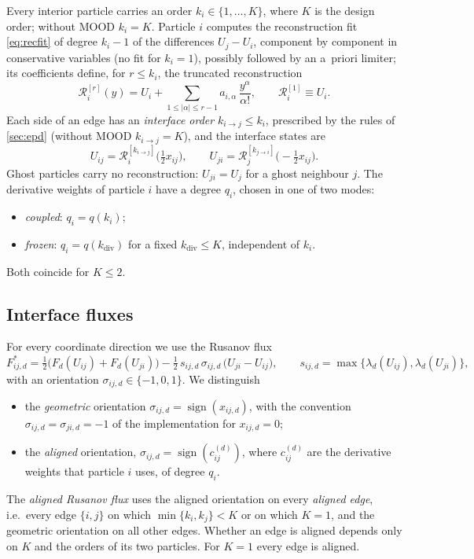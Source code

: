 \documentclass[11pt,a4paper]{article}
\theoremstyle{plain}
\theoremstyle{definition}
\theoremstyle{remark}
\numberwithin{equation}{section}
\newcommand{\Fs}{F^{*}}
\newcommand{\sgn}{\operatorname{sign}}
\newcommand{\ord}[2]{k_{#1\to #2}}
\newcommand{\qdiv}{q}
\begin{document}
Every interior particle carries an order $k_i\in\{1,\dots,K\}$, where $K$ is the design order; without MOOD $k_i=K$. Particle $i$ computes the reconstruction fit \eqref{eq:recfit} of degree $k_i-1$ of the differences $U_j-U_i$, component by component in conservative variables (no fit for $k_i=1$), possibly followed by an a~priori limiter; its coefficients define, for $r\le k_i$, the truncated reconstruction
\begin{equation}
\mathcal{R}^{[r]}_i(y) = U_i + \sum_{1\le|\alpha|\le r-1} a_{i,\alpha}\,\frac{y^\alpha}{\alpha!},\qquad \mathcal{R}^{[1]}_i\equiv U_i .
\end{equation}
Each side of an edge has an \emph{interface order} $\ord ij\le k_i$, prescribed by the rules of \cref{sec:epd} (without MOOD $\ord ij=K$), and the interface states are
\begin{equation}\label{eq:states}
U_{ij} = \mathcal{R}^{[\ord ij]}_i\big(\tfrac12 x_{ij}\big),\qquad U_{ji}=\mathcal{R}^{[\ord ji]}_j\big(-\tfrac12 x_{ij}\big).
\end{equation}
Ghost particles carry no reconstruction: $U_{ji}=U_j$ for a ghost neighbour $j$. The derivative weights of particle $i$ have a degree $q_i$, chosen in one of two modes:
\begin{itemize}
\item \emph{coupled}: $q_i=\qdiv(k_i)$;
\item \emph{frozen}: $q_i=\qdiv(k_{\mathrm{div}})$ for a fixed $k_{\mathrm{div}}\le K$, independent of $k_i$.
\end{itemize}
Both coincide for $K\le2$.

\subsection{Interface fluxes}\label{sec:fluxes}

For every coordinate direction we use the Rusanov flux
\begin{equation}\label{eq:rusanov}
\Fs_{ij,d} = \tfrac12\big(F_d(U_{ij})+F_d(U_{ji})\big) - \tfrac12\,s_{ij,d}\,\sigma_{ij,d}\,\big(U_{ji}-U_{ij}\big),\qquad
s_{ij,d} = \max\{\lambda_d(U_{ij}),\lambda_d(U_{ji})\},
\end{equation}
with an orientation $\sigma_{ij,d}\in\{-1,0,1\}$. We distinguish
\begin{itemize}
\item the \emph{geometric} orientation $\sigma_{ij,d}=\sgn(x_{ij,d})$, with the convention $\sigma_{ij,d}=\sigma_{ji,d}=-1$ of the implementation for $x_{ij,d}=0$;
\item the \emph{aligned} orientation, $\sigma_{ij,d}=\sgn(c^{(d)}_{ij})$, where $c^{(d)}_{ij}$ are the derivative weights that particle $i$ uses, of degree $q_i$.
\end{itemize}
The \emph{aligned Rusanov flux} uses the aligned orientation on every \emph{aligned edge}, i.e.\ every edge $\{i,j\}$ on which $\min\{k_i,k_j\}<K$ or on which $K=1$, and the geometric orientation on all other edges. Whether an edge is aligned depends only on $K$ and the orders of its two particles. For $K=1$ every edge is aligned.
\end{document}
